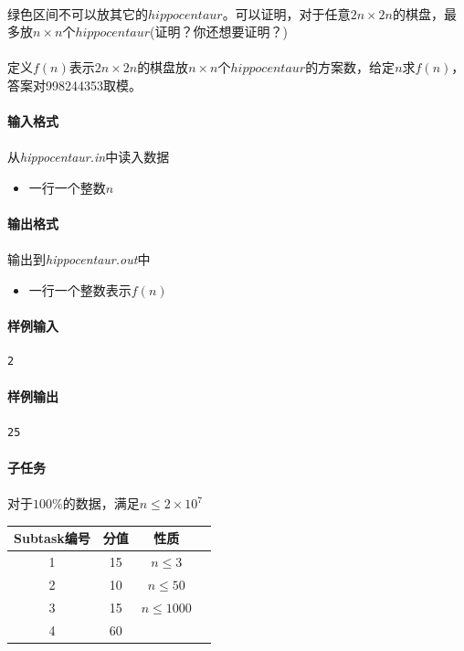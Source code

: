 \documentclass[UTF8]{ctexart}
\begin{document}
\paragraph{}绿色区间不可以放其它的$hippocentaur$。可以证明，对于任意$2n\times 2n$的棋盘，最多放$n\times n$个$hippocentaur$(证明？你还想要证明？)
\paragraph{}定义$f(n)$表示$2n\times 2n$的棋盘放$n\times n$个$hippocentaur$的方案数，给定$n$求$f(n)$，答案对998244353取模。
\paragraph{输入格式}
\paragraph{}从\emph{hippocentaur.in}中读入数据
\begin{itemize}
\item 一行一个整数$n$
\end{itemize}
\paragraph{输出格式}
\paragraph{}输出到\emph{hippocentaur.out}中
\begin{itemize}
	\item 一行一个整数表示$f(n)$
\end{itemize}
\paragraph{样例输入}
\begin{lstlisting}
2
\end{lstlisting}
\paragraph{样例输出}
\begin{lstlisting}
25
\end{lstlisting}
\paragraph{子任务}
\paragraph{}对于$100\%$的数据，满足$n\le 2\times 10^7$
\begin{center}
	\begin{tabular}{|c|c|c|c|}
		\hline
		Subtask编号&分值&性质\\
		\hline
		1&15&$n\le 3$\\
		\hline
		2&10&$n\le 50$\\
		\hline
		3&15&$n\le 1000$\\
		\hline
		4&60&\\
		\hline
	\end{tabular}	
\end{center}
\end{document}

